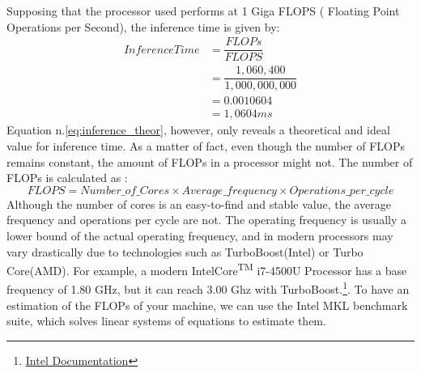 Supposing that the processor used performs at 1 Giga FLOPS ( Floating Point Operations per Second), the inference time is given by:
\begin{equation}
    \begin{aligned}
InferenceTime &= \dfrac{FLOPs}{FLOPS} \\
          &= \dfrac{1,060,400}{1,000,000,000}\\
          &= 0.0010604\\
          &= 1,0604 ms
    \end{aligned}
    \label{eq:inference_theor}
\end{equation}
Equation n.\ref{eq:inference_theor}, however, only reveals a theoretical and ideal value for inference time. As a matter of fact, even though the number of FLOPs remains constant, the amount of FLOPs in a processor might not. The number of FLOPs is calculated as :
\begin{equation}
FLOPS = Number\_of\_Cores \times Average\_frequency \times Operations\_per\_cycle
\end{equation}
Although the number of cores is an easy-to-find and stable value, the average frequency and operations per cycle are not. The operating frequency is usually a lower bound of the actual operating frequency, and in modern processors may vary drastically due to technologies such as TurboBoost(Intel) or Turbo Core(AMD). For example, a modern Intel\textregistered Core\textsuperscript{TM}  i7-4500U Processor has a base frequency of 1.80 GHz, but it can reach 3.00 Ghz with TurboBoost.\footnote{
\href{https://ark.intel.com/content/www/us/en/ark/products/75460/intel-core-i74500u-processor-4m-cache-up-to-3-00-ghz.html}{Intel Documentation}}. 
To have an estimation of the FLOPs of your machine, we can use the Intel MKL benchmark suite, which solves linear systems of equations to estimate them. \cite{intel_bench_suite}

